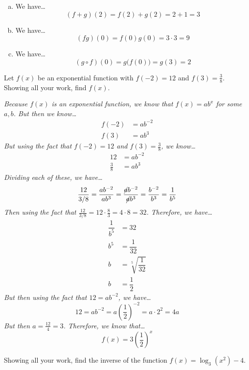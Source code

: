 \documentclass[12pt,letterpaper]{exam}
\begin{document}
\begin{questions}
{\begin{enumerate}[(a)]
\item We have\dots
	\[
	(f + g)(2)= f(2) + g(2)= 2 + 1= 3
	\] \pspace

\item We have\dots
	\[
	(fg)(0)= f(0) g(0)= 3 \cdot 3= 9 
	\] \pspace 

\item We have\dots
	\[
	(g \circ f)(0)= g\big( f(0) \big)= g(3)= 2 
	\] 
\end{enumerate}
}



\newpage
\question[10] Let $f(x)$ be an exponential function with $f(-2)= 12$ and $f(3)= \frac{3}{8}$. Showing all your work, find $f(x)$. \pspace

{\itshape
\sol Because $f(x)$ is an exponential function, we know that $f(x)= ab^x$ for some $a, b$. But then we know\dots
	\[
	\begin{aligned}
	f(-2)&= ab^{-2} \\
	f(3)&= ab^3
	\end{aligned}
	\]
But using the fact that $f(-2)= 12$ and $f(3)= \frac{3}{8}$, we know\dots
	\[
	\begin{aligned}
	12&= ab^{-2} \\
	\frac{3}{8}&= ab^3
	\end{aligned}
	\]
Dividing each of these, we have\dots
	\[
	\dfrac{12}{3/8}= \dfrac{a b^{-2}}{a b^3}= \dfrac{\cancel{a} b^{-2}}{\cancel{a} b^3}= \dfrac{b^{-2}}{b^3}= \dfrac{1}{b^5}
	\]
Then using the fact that $\frac{12}{3/8}= 12 \cdot \frac{8}{3}= 4 \cdot 8= 32$. Therefore, we have\dots
	\[
	\begin{aligned}
	\dfrac{1}{b^5}&= 32 \\
	b^5&= \dfrac{1}{32} \\
	b&= \sqrt[5]{\dfrac{1}{32}} \\
	b&= \dfrac{1}{2}
	\end{aligned}
	\]
But then using the fact that $12= ab^{-2}$, we have\dots
	\[
	12= ab^{-2}= a \left( \dfrac{1}{2} \right)^{-2}= a \cdot 2^2= 4a
	\]
But then $a= \frac{12}{4}= 3$. Therefore, we know that\dots
	\[
	f(x)= 3 \left( \dfrac{1}{2} \right)^x
	\]
}



\newpage
\question[10] Showing all your work, find the inverse of the function $f(x)= \log_3(x^2) - 4$. \pspace


\end{questions}
\end{document}
